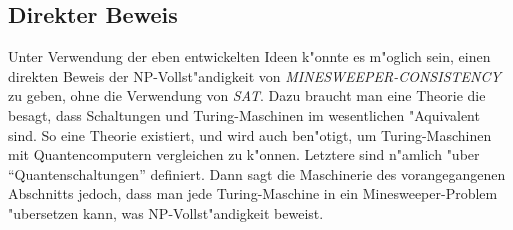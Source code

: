 \subsection{Direkter Beweis}
Unter Verwendung der eben entwickelten Ideen k"onnte es m"oglich sein,
einen direkten Beweis der NP-Vollst"andigkeit von
\textsl{MINESWEEPER-CONSISTENCY} zu geben, ohne die Verwendung
von \textsl{SAT}. Dazu braucht man eine Theorie die besagt, dass
Schaltungen und Turing-Maschinen im wesentlichen "Aquivalent sind.
So eine Theorie existiert, und wird auch ben"otigt, um Turing-Maschinen
mit Quantencomputern vergleichen zu k"onnen. Letztere sind n"amlich
"uber ``Quantenschaltungen'' definiert. Dann sagt die Maschinerie des
vorangegangenen Abschnitts jedoch, dass man jede Turing-Maschine in
ein Minesweeper-Problem "ubersetzen kann, was NP-Vollst"andigkeit
beweist.
